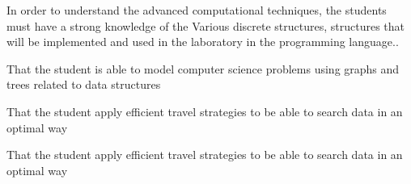 \begin{syllabus}


\begin{justification}
In order to understand the advanced computational techniques, the students must have a strong knowledge of the
Various discrete structures, structures that will be implemented and used in the laboratory in the programming language..
\end{justification}

\begin{goals}
\item That the student is able to model computer science problems using graphs and trees related to data structures
\item That the student apply efficient travel strategies to be able to search data in an optimal way
\item That the student apply efficient travel strategies to be able to search data in an optimal way
\end{goals}

\begin{outcomes}
    \item {}
    \item {}	
    \item {}
\end{outcomes}

\begin{competences}
    \item {}
    \item {}
    \item {}
\end{competences}


\end{syllabus}

